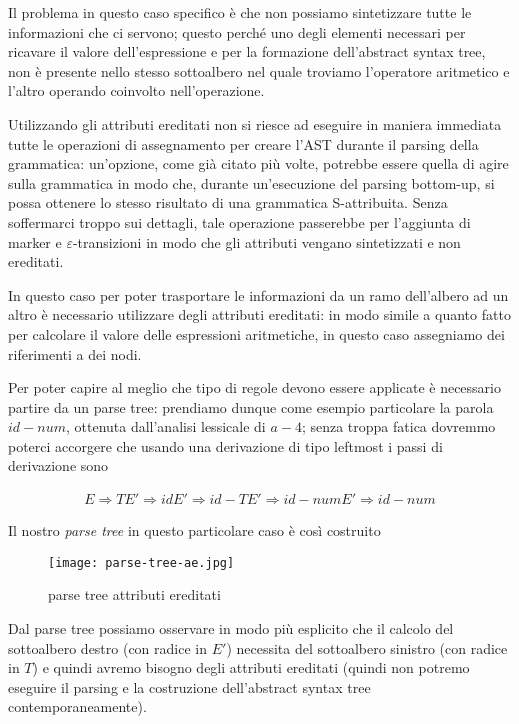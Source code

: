 \documentclass[class=book, crop=false, oneside, 12pt]{standalone}
\begin{document}

Il problema in questo caso specifico è che non possiamo sintetizzare tutte le informazioni che ci servono;
questo perché uno degli elementi necessari per ricavare il valore dell'espressione e per la formazione dell'abstract syntax tree, non è presente nello stesso sottoalbero nel quale troviamo l'operatore aritmetico e l'altro operando coinvolto nell'operazione. 

Utilizzando gli attributi ereditati non si riesce ad eseguire in maniera immediata tutte le operazioni di assegnamento per creare l'AST durante il parsing della grammatica: un'opzione, come già citato più volte, potrebbe essere quella di agire sulla grammatica in modo che, durante un'esecuzione del parsing bottom-up, si possa ottenere lo stesso risultato di una grammatica S-attribuita. Senza soffermarci troppo sui dettagli, tale operazione passerebbe per l'aggiunta di marker e \(\varepsilon\)-transizioni in modo che gli attributi vengano sintetizzati e non ereditati.

In questo caso per poter trasportare le informazioni da un ramo dell'albero ad un altro è necessario utilizzare degli attributi ereditati: in modo simile a quanto fatto per calcolare il valore delle espressioni aritmetiche, in questo caso assegniamo dei riferimenti a dei nodi. 

Per poter capire al meglio che tipo di regole devono essere applicate è necessario partire da un parse tree: prendiamo dunque come esempio particolare la parola \(id - num\), ottenuta dall'analisi lessicale di \(a - 4\); senza troppa fatica dovremmo poterci accorgere che usando una derivazione di tipo leftmost i passi di derivazione sono

\begin{align*}
    E \Rightarrow TE' \Rightarrow idE' \Rightarrow id-TE' \Rightarrow id-numE' \Rightarrow id-num
\end{align*}

Il nostro \emph{parse tree} in questo particolare caso è così costruito

\begin{figure}[H]
	\centering
    \texttt{[image: parse-tree-ae.jpg]}
    \caption{parse tree attributi ereditati}
    \label{fig:parse-tree-ae}
\end{figure}

Dal parse tree possiamo osservare in modo più esplicito che il calcolo del sottoalbero destro (con radice in \(E'\)) necessita del sottoalbero sinistro (con radice in \(T\)) e quindi avremo bisogno degli attributi ereditati (quindi non potremo eseguire il parsing e la costruzione dell'abstract syntax tree contemporaneamente).
\end{document}
